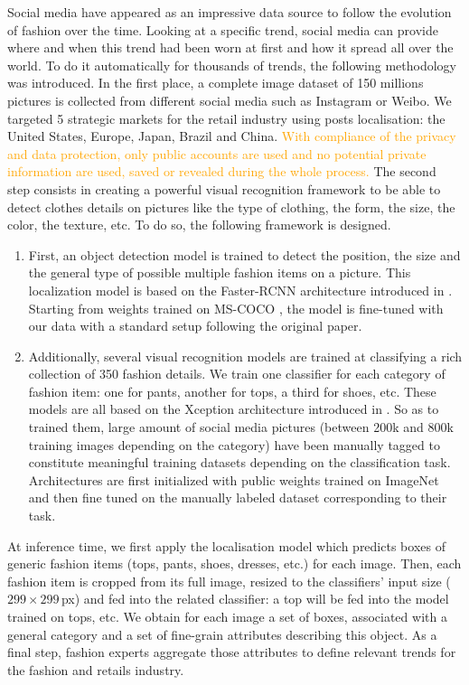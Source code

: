 \documentclass[10pt]{article} %
\begin{document}
Social media have appeared as an impressive data source to follow the evolution of fashion over the time. Looking at a specific trend, social media can provide where and when this trend had been worn at first and how it spread all over the world. To do it automatically for thousands of trends, the following methodology was introduced. In the first place, a complete image dataset of 150 millions pictures is collected from different social media such as Instagram or Weibo. We targeted 5 strategic markets for the retail industry using posts localisation: the United States, Europe, Japan, Brazil and China. \textcolor{orange}{With compliance of the privacy and data protection, only public accounts are used and no potential private information are used, saved or revealed during the whole process.}
The second step consists in creating a powerful visual recognition framework to be able to detect clothes details on pictures like the type of clothing, the form, the size, the color, the texture, etc. To do so, the following framework is designed.
\begin{enumerate}
    \item First, an object detection model is trained to detect the position, the size and the general type of possible multiple fashion items on a picture. This localization model is based on the Faster-RCNN architecture introduced in \citet{ren2015}. Starting from weights trained on MS-COCO \citep{lin2014}, the model is fine-tuned with our data with a standard setup following the original paper.
    \item  Additionally, several visual recognition models are trained at classifying a rich collection of 350 fashion details. We train one classifier for each category of fashion item: one for pants, another for tops, a third for shoes, etc. These models are all based on the Xception architecture introduced in \citet{chollet2017}. So as to trained them, large amount of social media pictures (between 200k and 800k training images depending on the category) have been manually tagged to constitute meaningful training datasets depending on the classification task. Architectures are first initialized with public weights trained on ImageNet \citep{russakovsky2014} and then fine tuned on the manually labeled dataset corresponding to their task.
\end{enumerate}

At inference time, we first apply the localisation model which predicts boxes of generic fashion items (tops, pants, shoes, dresses, etc.) for each image. Then, each fashion item is cropped from its full image, resized to the classifiers' input size ($299\times299\,$px) and fed into the related classifier: a top will be fed into the model trained on tops, etc. We obtain for each image a set of boxes, associated with a general category and a set of fine-grain attributes describing this object. As a final step, fashion experts aggregate those attributes to define relevant trends for the fashion and retails industry.
\end{document}

